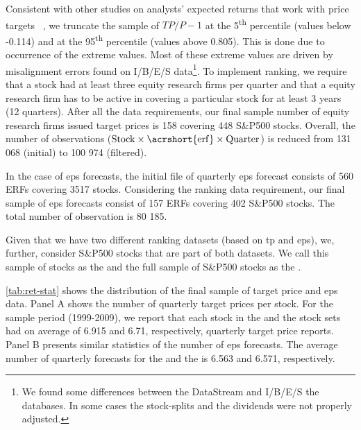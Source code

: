 \documentclass[a4paper,twoside,12pt,openright,notitlepage]{report}\usepackage[]{graphicx}\usepackage[]{color}
\begin{document}

Consistent with other studies on analysts' expected returns that work with price targets ~\citep{bradshaw2002,brav2003,da2011}, we truncate the sample of $TP/P-1$ at the 5\textsuperscript{th} percentile (values below -0.114) and at the 95\textsuperscript{th} percentile (values above 0.805). This is done due to occurrence of the extreme values. Most of these extreme values are driven by misalignment errors found on I/B/E/S data\footnote{We found some differences between the  DataStream and I/B/E/S the databases. In some cases the stock-splits and the dividends were not properly adjusted.}. To implement ranking, we require that a stock had at least three equity research firms per quarter and that a equity research firm has to be active in covering a particular stock for at least 3 years (12 quarters). After all the  data requirements, our final sample number of equity research firms issued target prices is 158 covering 448 S\&P500 stocks. Overall, the number of observations ($\mathrm{Stock} \times \mathrm{\acrshort{erf}} \times  \mathrm{Quarter}$) is reduced  from 131 068 (initial) to 100 974 (filtered).

In the case of \gls{eps} forecasts, the initial file of quarterly \gls{eps} forecast consists of 560 ERFs covering 3517 stocks. Considering the ranking data requirement, our final sample of \gls{eps} forecasts consist of  157 ERFs covering 402 S\&P500 stocks. The total number of observation is 80 185.


Given that we have two different ranking datasets (based on \gls{tp} and \gls{eps}), we, further, consider S\&P500 stocks that are part of both datasets. We call this sample of stocks as the \same{} and the full sample of S\&P500 stocks as the \all{}.

\ref{tab:ret-stat} shows the distribution of the final sample of target price and \gls{eps} data. Panel A shows the number of quarterly target prices per stock. For the sample period (1999-2009), we report that each stock in the \same{} and the \all{} stock sets had on average of 6.915 and 6.71, respectively, quarterly target price reports. Panel B  presents similar statistics of the number of \gls{eps} forecasts. The average number of quarterly forecasts for the  \same{} and the \all{} is 6.563 and 6.571, respectively.
\end{document}
